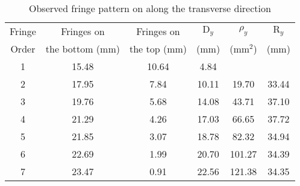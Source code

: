 \begin{table}[H]
    \centering
    \begin{tabular}{|c|c|c|c|c|c|}
        \hline
        Fringe    & Fringes on     & Fringes on       & $\text{D}_y$        & $\rho_y$   & $\text{R}_y$    \\ 
        Order     & the bottom (mm)  & the top (mm)   & (mm)       & ($\text{mm}^2$)   & (mm)   \\ \hline
        1 & 15.48 & 10.64 &  4.84 &       &      \\
         2 & 17.95 &  7.84 & 10.11 &  19.70 & 33.44 \\
         3 & 19.76 &  5.68 & 14.08 &  43.71 & 37.10 \\
         4 & 21.29 &  4.26 & 17.03 &  66.65 & 37.72 \\
         5 & 21.85 &  3.07 & 18.78 &  82.32 & 34.94 \\
         6 & 22.69 &  1.99 & 20.70 & 101.27 & 34.39 \\
         7 & 23.47 &  0.91 & 22.56 & 121.38 & 34.35 \\
        \hline
       \end{tabular}
    \caption{Observed fringe pattern on along the transverse direction}
    \label{tab:2}
\end{table}